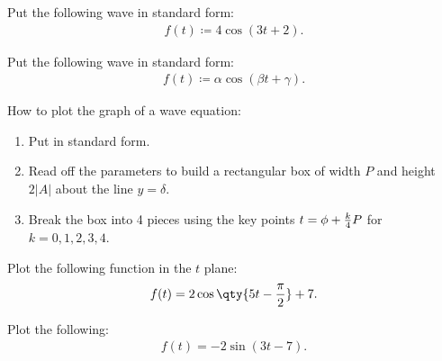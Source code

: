 \begin{example}[?]

Put the following wave in standard form:
\begin{align*}
f(t) \coloneqq 4\cos(3t+2)
.\end{align*}

\end{example}

\begin{example}[?]

Put the following wave in standard form:
\begin{align*}
f(t) \coloneqq\alpha \cos(\beta t+\gamma)
.\end{align*}

\end{example}

\begin{proposition}[?]

How to plot the graph of a wave equation:

\begin{enumerate}
\def\labelenumi{\arabic{enumi}.}
\tightlist
\item
  Put in standard form.
\item
  Read off the parameters to build a rectangular box of width \(P\) and
  height \(2{\left\lvert {A} \right\rvert}\) about the line
  \(y=\delta\).
\item
  Break the box into 4 pieces using the key points
  \(t = \phi + {k\over 4}P\) for \(k=0,1,2,3,4\).
\end{enumerate}

\end{proposition}

\begin{example}[Plotting]

Plot the following function in the \(t\) plane:
\begin{align*}
f(t) = 2 \cos\qty{5t - {\pi \over 2} } + 7
.\end{align*}

\end{example}

\begin{example}[?]

Plot the following:
\begin{align*}
f(t) = -2\sin(3t-7)
.\end{align*}

\end{example}

